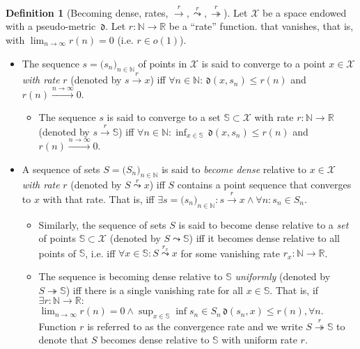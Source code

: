 \documentclass{article} %
\theoremstyle{definition}
\newtheorem{defn}[thm]{Definition}
\theoremstyle{remark}
\newcommand{\Real}{\mathbb R}
\newcommand{\nat}{\mathbb N}
\newcommand{\inspace}{\ensuremath{ \mathcal X}}
\newcommand{\metric}{\, \mathfrak{d}} %
\newcommand{\seq}[2]{\ensuremath{\bigl(#1\bigr)_{#2}}}
\newcommand{\convton}{\stackrel{n \to \infty}\longrightarrow}
\newcommand{\convto}{\longrightarrow}
\newcommand{\setconvto}{\longrightarrow}
\newcommand{\bd}{\leadsto} %
\newcommand{\bdu}{\twoheadrightarrow} %
\begin{document}
\begin{defn} [Becoming dense, rates, $\stackrel{r}{\convto}, \stackrel{r}{\bd}, \stackrel{r}{\bdu}$]
Let $\inspace$ be a space endowed with a pseudo-metric $\metric$. 
Let $r:\nat \to \Real$ be a ``rate'' function. 
that vanishes, that is, with $\lim_{n \to \infty} r(n) = 0$ (i.e. $r \in o(1)$).
\begin{itemize}
\item The sequence $s =\seq{s_n}{n \in \nat}$ of points in $\inspace$ is said to converge to a point $x \in \inspace$ \emph{with rate} $r$ (denoted by $s \stackrel{r} \convto x$) iff  $\forall n \in \nat : \metric(x,s_n) \leq r(n)$ and $r(n) \convton 0$. 
\begin{itemize}
\item The sequence $s $ is said to converge to a set $\mathbb S \subset \inspace$  with rate $r:\nat \to \Real$ (denoted by $s \stackrel{r} \setconvto \mathbb S$) iff $\forall n\in \nat : \inf_{x \in \mathbb S}\metric(x,s_n) \leq r(n)$ and $r(n) \convton 0$. 
\end{itemize}
\item A sequence of sets $S = \seq{S_n}{n \in \nat}$ is said to \emph{become dense} relative to $x \in \inspace$  \emph{with rate} $r$ (denoted by $S \stackrel{r}{\bd} x$) iff $S$ contains a point sequence that converges to $x$ with that rate. That is, iff $\exists s= \seq{s_n}{n\in \nat}: s \stackrel{r}\convto x \wedge \forall n: s_n \in S_n$. 
\begin{itemize}
\item Similarly, the sequence of sets $S$ is said to become dense relative to a \emph{set}  of points $\mathbb S \subset \inspace $ (denoted by $S \bd \mathbb S$) iff it becomes dense relative to all points of $\mathbb S$, i.e. iff $\forall x \in \mathbb S : S \stackrel{r_x}{\bd} x$ for some vanishing rate $r_x : \nat \to \Real$. 
\item The sequence is becoming dense relative to $\mathbb S$ \emph{uniformly} (denoted by $S \bdu \mathbb S$) iff there is a single vanishing rate for all $x \in \mathbb S$. That is, if $\exists r:\nat \to \Real:$ $\lim_{n\to \infty} r(n) =0 \wedge \sup_{x \in \mathbb S} \inf{s_n \in S_n} \metric(s_n,x) \leq r(n), \forall n$. Function $r$ is referred to as the convergence rate and we write $S \stackrel{r}{\bdu}\mathbb S$ to denote that $S$ becomes dense relative to $\mathbb S$ with uniform rate $r$.
\end{itemize}
\end{itemize}
\end{defn}
\end{document}
